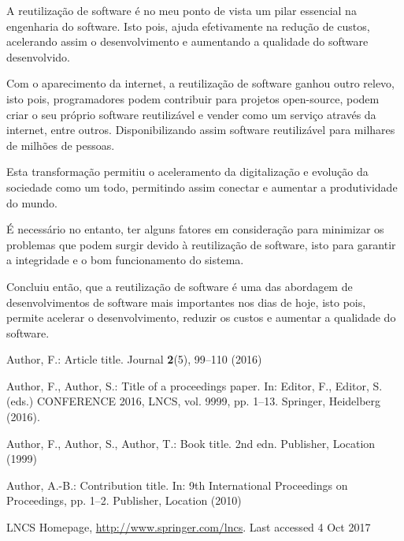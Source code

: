 \documentclass[runningheads]{llncs}
\begin{document}
A reutilização de software é no meu ponto de vista um pilar essencial na engenharia do software. Isto pois, ajuda efetivamente na redução de custos,  acelerando assim o desenvolvimento e aumentando a qualidade do software desenvolvido. \par
Com o aparecimento da internet, a reutilização de software ganhou outro relevo, isto pois, programadores podem contribuir para projetos open-source, podem criar o seu próprio software reutilizável e vender como um serviço através da internet, entre outros. Disponibilizando assim software reutilizável para milhares de milhões de pessoas.\par
Esta transformação permitiu o aceleramento da digitalização e evolução da sociedade como um todo, permitindo assim conectar e aumentar a produtividade do mundo.\par
É necessário no entanto, ter alguns fatores em consideração para minimizar os problemas que podem surgir devido à reutilização de software, isto para garantir a integridade e o bom funcionamento do sistema.\par
Concluiu então, que a reutilização de software é uma das abordagem de desenvolvimentos de software mais importantes nos dias de hoje, isto pois, permite acelerar o desenvolvimento, reduzir os custos e aumentar a qualidade do software.


%
%
%
% 
% 
%
\begin{thebibliography}{8}
    Author, F.: Article title. Journal \textbf{2}(5), 99--110 (2016)
    
    Author, F., Author, S.: Title of a proceedings paper. In: Editor,
    F., Editor, S. (eds.) CONFERENCE 2016, LNCS, vol. 9999, pp. 1--13.
    Springer, Heidelberg (2016). 
    
    Author, F., Author, S., Author, T.: Book title. 2nd edn. Publisher,
    Location (1999)
    
    Author, A.-B.: Contribution title. In: 9th International Proceedings
    on Proceedings, pp. 1--2. Publisher, Location (2010)
    
    LNCS Homepage, \url{http://www.springer.com/lncs}. Last accessed 4
    Oct 2017
    \end{thebibliography}
\end{document}

